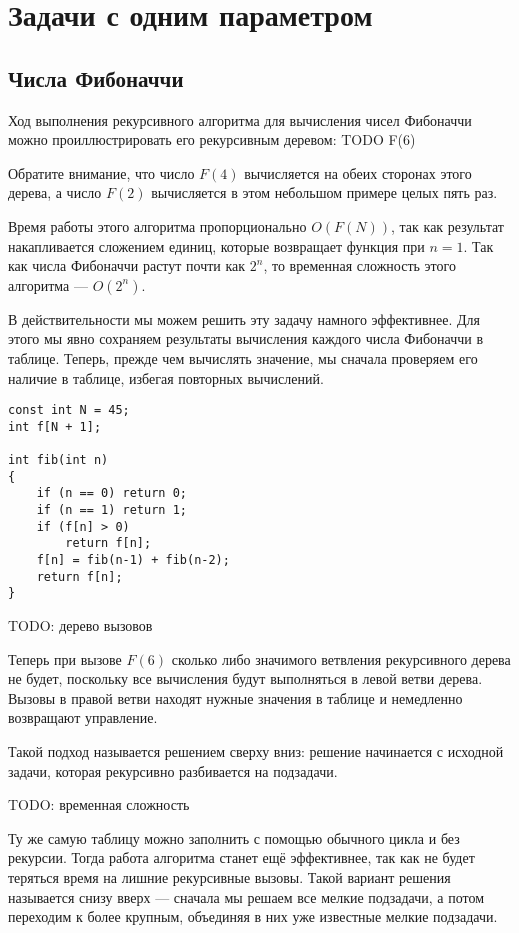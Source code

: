 \documentclass[14pt,openany]{book}
\begin{document}
\chapter{Задачи с одним параметром}

\section{Числа Фибоначчи}

Ход выполнения рекурсивного алгоритма для вычисления чисел Фибоначчи
можно проиллюстрировать его рекурсивным деревом: TODO F(6)

Обратите внимание, что число $F(4)$ вычисляется на обеих сторонах этого дерева, а число
$F(2)$ вычисляется в этом небольшом примере целых пять раз.

Время работы этого алгоритма пропорционально $O(F(N))$, так как результат накапливается
сложением единиц, которые возвращает функция при $n=1$. Так как числа Фибоначчи растут почти
как $2^n$, то временная сложность этого алгоритма --- $O(2^n)$.

В действительности мы можем решить эту задачу намного эффективнее. Для этого мы явно сохраняем
результаты вычисления каждого числа Фибоначчи в таблице. Теперь, прежде чем вычислять
значение, мы сначала проверяем его наличие в таблице, избегая повторных вычислений.

\begin{lstlisting}
const int N = 45;
int f[N + 1];

int fib(int n)
{
    if (n == 0) return 0;
    if (n == 1) return 1;
    if (f[n] > 0)
        return f[n];
    f[n] = fib(n-1) + fib(n-2);
    return f[n];
}
\end{lstlisting}

TODO: дерево вызовов

Теперь при вызове $F(6)$ сколько либо значимого ветвления рекурсивного дерева не будет,
поскольку все вычисления будут выполняться в левой ветви дерева. Вызовы в правой ветви
находят нужные значения в таблице и немедленно возвращают управление.

Такой подход называется решением сверху вниз: решение начинается с исходной задачи, которая 
рекурсивно разбивается на подзадачи.

TODO: временная сложность

Ту же самую таблицу можно заполнить с помощью обычного цикла и без рекурсии.
Тогда работа алгоритма станет ещё эффективнее, так как не будет теряться время на
лишние рекурсивные вызовы.
Такой вариант решения называется снизу вверх --- сначала мы решаем все мелкие подзадачи,
а потом переходим к более крупным, объединяя в них уже известные мелкие подзадачи.
\end{document}
